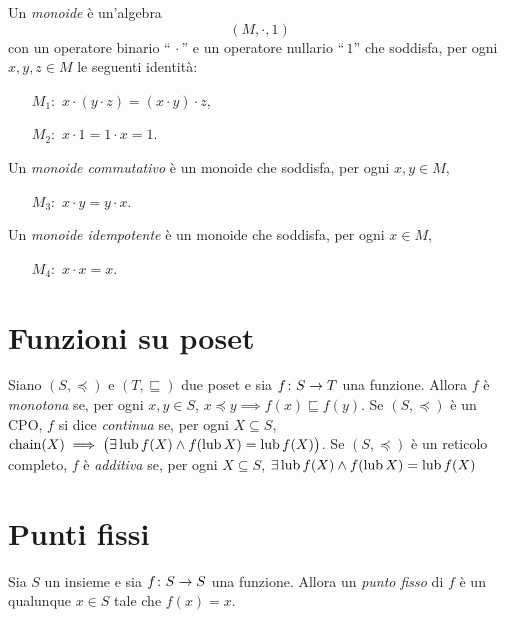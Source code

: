 \begin{definizione}  
Un \emph{monoide} \`e un'algebra
\[
    (M, \cdot, 1)
\]
con un operatore binario ``$\,\cdot$'' e un operatore nullario ``$\,1$'' che
soddisfa, per ogni $x,y,z\in M$ le seguenti identit\`a:
\begin{itemize}
\item[$M_1:$] $x \cdot (y \cdot z) = (x \cdot y) \cdot z$,
\item[$M_2:$] $x \cdot 1 = 1 \cdot x = 1$.
\end{itemize}
Un \emph{monoide commutativo} \`e un monoide che soddisfa, per ogni $x,y \in M$,
\begin{itemize}
\item[$M_3:$] $x \cdot y = y \cdot x$.
\end{itemize}
Un \emph{monoide idempotente} \`e un monoide che soddisfa, per ogni $x \in M$,
\begin{itemize}
\item[$M_4:$] $x \cdot x = x$.
\end{itemize}
\end{definizione}

\section{Funzioni su poset}

\begin{definizione} 
Siano $(S, \preceq)$ e $(T, \sqsubseteq)$ due poset
e sia $\mathord{f}\colon S\to T$ una funzione.
Allora
$f$ è \emph{monotona} se, per ogni $x, y \in S$,
$x \preceq y \implies f(x) \sqsubseteq f(y)$.
Se $(S, \preceq)$ \`e un CPO,
$f$ si dice \emph{continua} se, per ogni $X \subseteq S$,
$\mathop{\mathrm{chain}}\nolimits(X) \implies \bigl(\exists \mathop{\mathrm{lub}}\nolimits f(X) \land f(\mathop{\mathrm{lub}}\nolimits X) = \mathop{\mathrm{lub}}\nolimits f(X)\bigr)$.
Se $(S, \preceq)$ \`e un reticolo completo,
$f$ è \emph{additiva} se, per ogni $X \subseteq S$,
$\exists \mathop{\mathrm{lub}}\nolimits f(X) \land f(\mathop{\mathrm{lub}}\nolimits X) = \mathop{\mathrm{lub}}\nolimits f(X)$
\end{definizione}


\section{Punti fissi}

\begin{definizione} 
Sia $S$ un insieme e sia $\mathord{f}\colon S\to S$ una funzione.
Allora un \emph{punto fisso} di $f$ è un qualunque $x \in S$ tale
che $f(x) = x$.
\end{definizione}

